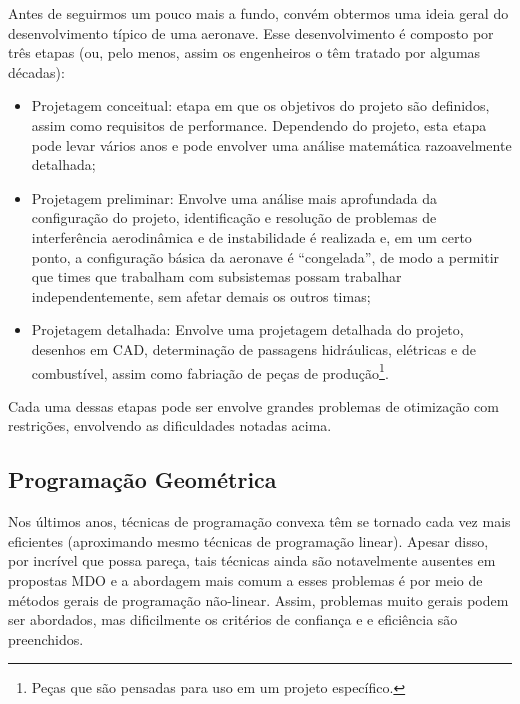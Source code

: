 \documentclass{article}
\begin{document}
Antes de seguirmos um pouco mais a fundo, convém obtermos uma ideia geral do desenvolvimento típico de uma aeronave. Esse desenvolvimento
é composto por três etapas\cite{hoburg} (ou, pelo menos, assim os engenheiros o têm tratado por algumas décadas):
\begin{itemize}
\item Projetagem conceitual: etapa em que os objetivos do projeto são definidos, assim como requisitos de performance. Dependendo
  do projeto, esta etapa pode levar vários anos e pode envolver uma análise matemática razoavelmente detalhada;  
\item Projetagem preliminar:
  Envolve uma análise mais aprofundada da configuração do projeto, identificação e resolução de problemas de interferência aerodinâmica e
  de instabilidade é realizada e, em um certo ponto, a configuração básica da aeronave é ``congelada'', de modo a permitir que times que
  trabalham com subsistemas possam trabalhar independentemente, sem afetar demais os outros timas;
\item Projetagem detalhada:
  Envolve uma projetagem detalhada do projeto, desenhos em CAD, determinação de passagens hidráulicas, elétricas e de combustível, assim
  como fabriação de peças de produção\footnote{Peças que são pensadas para uso em um projeto específico.}.
\end{itemize}

Cada uma dessas etapas pode ser envolve grandes problemas de otimização com restrições, envolvendo as dificuldades notadas acima.
    
\subsection{Programação Geométrica}

Nos últimos anos, técnicas de programação convexa têm se tornado cada vez mais eficientes (aproximando mesmo técnicas de programação linear).
Apesar disso, por incrível que possa pareça, tais técnicas ainda são notavelmente ausentes em propostas MDO\cite{hoburg} e a abordagem mais
comum a esses problemas é por meio de métodos gerais de programação não-linear. Assim, problemas muito gerais podem ser abordados, mas
dificilmente os critérios de confiança e e eficiência são preenchidos.
\end{document}

